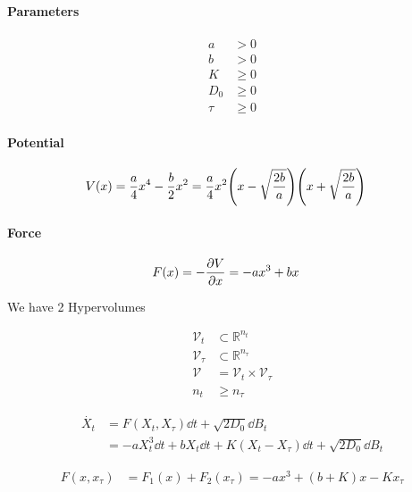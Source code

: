 \documentclass[a4paper,10pt]{article}
\begin{document}
\paragraph{Parameters}

\begin{align}
	a&>0
\\
	b&>0
\\
	K&\geq 0
\\
	D_0
	&\geq 0
\\
	\tau
	&\geq 0
\end{align}


\paragraph{Potential}

\begin{align}
	V(x)
	&=
	\frac{a}{4}
	x^4
	-
	\frac{b}{2}
	x^2
	=
	\frac{a}{4}
	x^2
	\pqty{
		x-\sqrt{\frac{2b}{a}}
	}
	\pqty{
		x+\sqrt{\frac{2b}{a}}	
	}
\end{align}

\paragraph{Force}

\begin{align}
	F(x)
	&=
	-\pdv{V}{x}
	=
	-
	a
	x^3
	+
	b
	x
\end{align}


We have 2 Hypervolumes

\begin{align}
	\mathcal{V}_t
	&\subset
	\mathbb{R}^{n_t}
\\
	\mathcal{V}_\tau
	&\subset
	\mathbb{R}^{n_\tau}
\\
	\mathcal{V}
	&=
	\mathcal{V}_t
	\times
	\mathcal{V}_\tau
\\
	n_t
	&\geq
	n_\tau
\end{align}


\begin{align}
	\dot{X_t}
	&=
	F(X_t,X_\tau)
	\dd{t}
	+
	\sqrt{2D_0}
	\dd{B}_t
\\	
	&=
	-
	a
	X_t^3
	\dd{t}
	+
	b
	X_t
	\dd{t}
	+
	K
	(X_t-X_\tau)
	\dd{t}
	+
	\sqrt{2D_0}
	\dd{B}_t
\end{align}

\begin{align}
	F(x,x_\tau)
	&=
	F_1(x)
	+
	F_2(x_\tau)
	=
	-
	ax^3
	+
	(b+K)x
	-
	Kx_\tau
\end{align}
\end{document}
